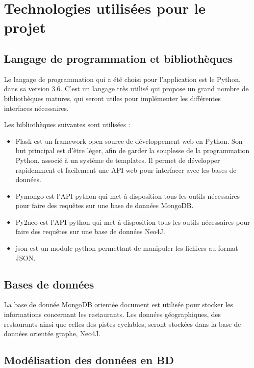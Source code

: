 \documentclass[12pt]{article}
\begin{document}
\section{Technologies utilisées pour le projet}

\subsection{Langage de programmation et bibliothèques}

    Le langage de programmation qui a été choisi pour l'application est le Python, dans sa version 3.6. C'est un langage très utilisé qui propose un grand nombre de bibliothèques matures, qui seront utiles pour implémenter les différentes interfaces nécessaires.

    Les bibliothèques suivantes sont utilisées :

    \begin{itemize}
        \item Flask est un framework open-source de développement web en Python. Son but principal est d'être léger, afin de garder la souplesse de la programmation Python, associé à un système de templates. Il permet de développer rapidemment et facilement une API web pour interfacer avec les bases de données.
        \item Pymongo est l'API python qui met à disposition tous les outils nécessaires pour faire des requêtes sur une base de données MongoDB.
        \item Py2neo est l'API python qui met à disposition tous les outils nécessaires pour faire des requêtes sur une base de données Neo4J.
        \item json est un module python permettant de manipuler les fichiers au format JSON. 
    \end{itemize}

\subsection{Bases de données}

    La base de donnée MongoDB orientée document est utilisée pour stocker les informations concernant les restaurants. Les données géographiques, des restaurants ainsi que celles des pistes cyclables, seront stockées dans la base de données orientée graphe, Neo4J.

\subsection{Modélisation des données en BD}
\end{document}
